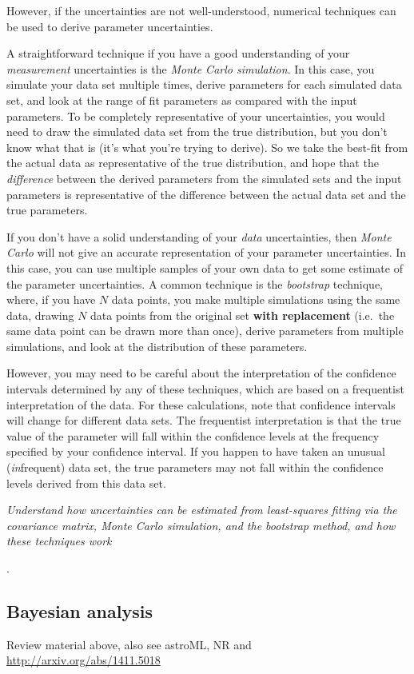 \documentclass{article}
\newcommand{\test}[1]{%
    \begin{center}
        \colorbox{hl}{\parbox{0.9\textwidth}{\emph{#1}}}
    \end{center}}
\begin{document}
However, if the uncertainties are not well-understood, numerical techniques can
be used to derive parameter uncertainties.

A straightforward technique if you have a good understanding of your
\emph{measurement} uncertainties is the \emph{Monte Carlo simulation}. In this
case, you simulate your data set multiple times, derive parameters for each
simulated data set, and look at the range of fit parameters as compared with
the input parameters.  To be completely representative of your uncertainties,
you would need to draw the simulated data set from the true distribution, but
you don't know what that is (it's what you're trying to derive).  So we take
the best-fit from the actual data as representative of the true distribution,
and hope that the \emph{difference} between the derived parameters from the
simulated sets and the input parameters is representative of the difference
between the actual data set and the true parameters.

If you don't have a solid understanding of your \emph{data} uncertainties, then
\emph{Monte Carlo} will not give an accurate representation of your parameter
uncertainties. In this case, you can use multiple samples of your own data to
get some estimate of the parameter uncertainties. A common technique is the
\emph{bootstrap} technique, where, if you have $N$ data points, you make
multiple simulations using the same data, drawing $N$ data points from the
original set \- {\bf with replacement} (i.e.\ the same data point can be drawn
more than once), derive parameters from multiple simulations, and look at the
distribution of these parameters.

However, you may need to be careful about the interpretation of the confidence
intervals determined by any of these techniques, which are based on a
frequentist interpretation of the data. For these calculations, note that
confidence intervals will change for different data sets. The frequentist
interpretation is that the true value of the parameter will fall within the
confidence levels at the frequency specified by your confidence interval. If
you happen to have taken an unusual (\emph{in}frequent) data set, the true
parameters may not fall within the confidence levels derived from
this data set.

\test{Understand how uncertainties can be estimated from least-squares
fitting via the covariance matrix, Monte Carlo simulation, and the
bootstrap method, and how these techniques work}.

\subsection{Bayesian analysis}
Review material above, also see astroML, NR and
\url{http://arxiv.org/abs/1411.5018}
\end{document}
